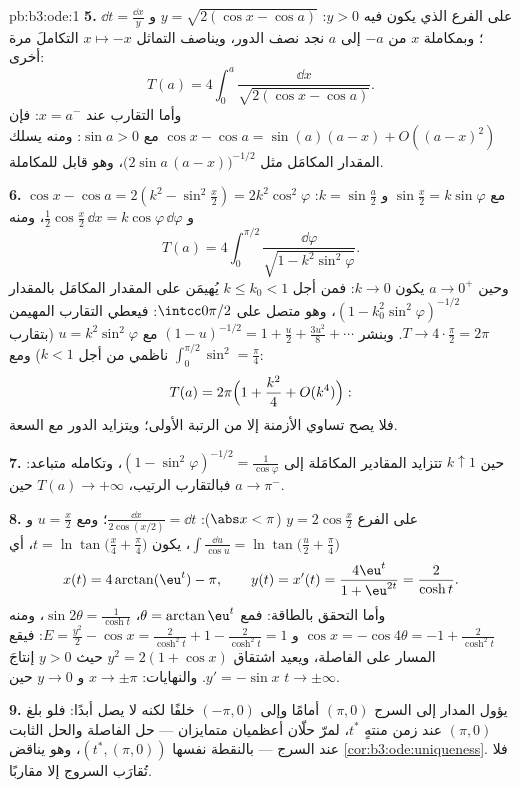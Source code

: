 \begin{solution}{pb:b3:ode:1}
\textbf{5.} على الفرع الذي يكون فيه $y > 0$: $y = \sqrt{2(\cos x
- \cos a)}$ و $\dd t = \frac{\dd x}{y}$؛
وبمكاملة $x$ من $-a$ إلى $a$ نجد نصف الدور، ويناصف التماثل
$x
\mapsto -x$ التكاملَ مرة أخرى:
\[
T(a) = 4\int_0^a\frac{\dd x}{\sqrt{2(\cos x - \cos a)}} .
\]
وأما التقارب عند $x = a^-$: فإن $\cos x - \cos a = \sin(a)(a - x) +
O((a-x)^2)$ مع $\sin a > 0$: ومنه
يسلك المقدار المكامَل مثل $\bigl(2\sin a\,(a - x)\bigr)^{-1/2}$، وهو قابل للمكاملة.

\textbf{6.} مع $\sin\frac x2 = k\sin\varphi$ و $k =
\sin\frac a2$: $\cos x - \cos a = 2(k^2 - \sin^2\frac x2)
= 2k^2\cos^2\varphi$ و $\frac12\cos\frac x2\,\dd x =
k\cos\varphi\,\dd\varphi$، ومنه
\[
T(a) = 4\int_0^{\pi/2}
\frac{\dd\varphi}{\sqrt{1 - k^2\sin^2\varphi}} .
\]
وحين $a \to 0^+$ يكون $k \to 0$: فمن أجل $k \leq k_0 < 1$
يُهيمَن على المقدار المكامَل بالمقدار $(1 - k_0^2\sin^2\varphi)^{-1/2}$، وهو متصل على
$\intcc0{\pi/2}$: فيعطي التقارب المهيمن $T \to
4\cdot\frac\pi2 = 2\pi$. وبنشر $(1 - u)^{-1/2} = 1 +
\frac u2 + \frac{3u^2}8 + \cdots$
مع $u =
k^2\sin^2\varphi$ (بتقارب ناظمي من أجل $k < 1$) ومع $\int_0^{\pi/2}\sin^2 = \frac\pi4$:
\[
T(a) = 2\pi\Bigl(1 + \frac{k^2}{4} + O(k^4)\Bigr) :
\]
فلا يصح تساوي الأزمنة إلا من الرتبة الأولى؛ ويتزايد الدور مع
السعة.

\textbf{7.} حين $k \uparrow 1$ تتزايد المقادير المكامَلة إلى
$(1
- \sin^2\varphi)^{-1/2} = \frac1{\cos\varphi}$، وتكامله متباعد: فبالتقارب الرتيب، $T(a) \to
+\infty$ حين
$a \to \pi^-$.

\textbf{8.} على الفرع $y = 2\cos\frac x2$ ($\abs x <
\pi$): $\frac{\dd x}{2\cos(x/2)} = \dd t$؛ ومع $u = \frac
x2$
و $\int\frac{\dd u}{\cos u} =
\ln\tan\bigl(\frac u2 + \frac\pi4\bigr)$، يكون $t =
\ln\tan\bigl(\frac x4 + \frac\pi4\bigr)$، أي
\[
x(t) = 4\arctan(\eu^t) - \pi,
\qquad y(t) = x'(t) = \frac{4\eu^t}{1 + \eu^{2t}} =
\frac{2}{\cosh t} .
\]
وأما التحقق بالطاقة: فمع $\theta = \arctan\eu^t$، $\sin2\theta = \frac1{\cosh t}$، ومنه $\cos x = -\cos4\theta =
-1 + \frac{2}{\cosh^2t}$
و $E = \frac{y^2}2 - \cos x =
\frac2{\cosh^2t} + 1 - \frac2{\cosh^2t} = 1$: فيقع المسار على الفاصلة، ويعيد اشتقاق $y^2 = 2(1 +
\cos x)$ حيث
$y > 0$ إنتاجَ $y' = -\sin x$. والنهايات: $x
\to \pm\pi$ و $y \to 0$
حين $t \to \pm\infty$.

\textbf{9.} يؤول المدار إلى السرج $(\pi, 0)$ أمامًا وإلى
$(-\pi, 0)$ خلفًا لكنه لا يصل أبدًا: فلو بلغ $(\pi, 0)$ عند زمن
منتهٍ $t^*$، لمرّ حلّان أعظميان متمايزان --- حل الفاصلة والحل
الثابت عند السرج --- بالنقطة نفسها $(t^*, (\pi, 0))$، وهو يناقض
\cref{cor:b3:ode:uniqueness}. فلا تُقارَب السروج إلا مقاربًا.


\end{solution}

